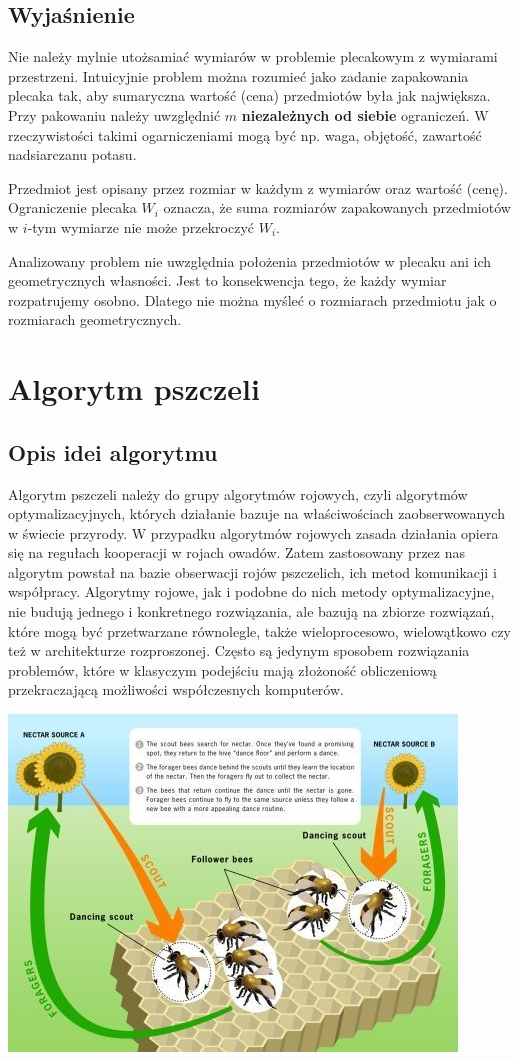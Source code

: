 \documentclass[a4paper,12pt,notitlepage]{mwrep}
\begin{document}
\section{Wyjaśnienie}
Nie należy mylnie utożsamiać wymiarów w problemie plecakowym z 
wymiarami przestrzeni. Intuicyjnie problem można rozumieć jako zadanie
zapakowania plecaka tak, aby sumaryczna wartość (cena)
przedmiotów była jak największa.
Przy pakowaniu należy uwzględnić $m$ \textbf{niezależnych od siebie}
ograniczeń. W rzeczywistości takimi ogarniczeniami mogą być np. waga,
objętość, zawartość nadsiarczanu potasu.

Przedmiot jest opisany przez
rozmiar w każdym z wymiarów oraz wartość (cenę). Ograniczenie plecaka
$W_i$ oznacza, że suma rozmiarów zapakowanych przedmiotów w $i$-tym
wymiarze nie może przekroczyć $W_i$.

Analizowany problem nie uwzględnia położenia przedmiotów w plecaku
ani ich geometrycznych własności. Jest to konsekwencja tego, że każdy
wymiar rozpatrujemy osobno. Dlatego nie można myśleć o rozmiarach
przedmiotu jak o rozmiarach geometrycznych.

\chapter{Algorytm pszczeli}
\section{Opis idei algorytmu}
Algorytm pszczeli należy do grupy algorytmów rojowych, czyli algorytmów optymalizacyjnych, których działanie bazuje na właściwościach zaobserwowanych w świecie przyrody. W przypadku algorytmów rojowych zasada działania opiera się na regułach kooperacji w rojach owadów. Zatem zastosowany przez nas algorytm powstał na bazie obserwacji rojów pszczelich, ich metod komunikacji i współpracy. Algorytmy rojowe, jak i podobne do nich metody optymalizacyjne, nie budują jednego i konkretnego rozwiązania, ale bazują na zbiorze rozwiązań, które mogą być przetwarzane równolegle, także wieloprocesowo, wielowątkowo czy też w architekturze rozproszonej. Często są jedynym sposobem rozwiązania problemów, które w klasyczym podejściu mają złożoność obliczeniową przekraczającą możliwości współczesnych komputerów.

\includegraphics{./images/pszczoly.jpeg}
\end{document}
